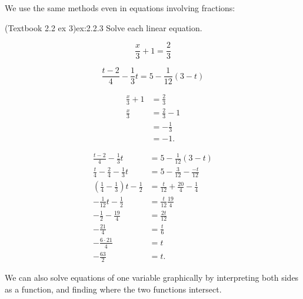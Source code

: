 \documentclass{article}
\begin{document}
We use the same methods even in equations involving fractions:
\begin{example}{(Textbook 2.2 ex 3)}{ex:2.2.3}
    Solve each linear equation.
    \begin{problem}
        \item \[\frac{x}{3}+1=\frac{2}{3}\] 
        \item \[\frac{t-2}{4}-\frac{1}{3}t = 5 - \frac{1}{12}(3-t)\] 
    \end{problem}
\end{example}
\begin{solution}
    \begin{problem}
        \item \begin{align*}
            \frac{x}{3}+1&=\frac{2}{3}\\
            \frac{x}{3}&=\frac{2}{3}-1\\
            &=-\frac{1}{3}\\
            &=-1.
        \end{align*}
        \item \begin{align*}
            \frac{t-2}{4}-\frac{1}{3}t&=5-\frac{1}{12}(3-t)\\
            \frac{t}{4}-\frac{2}{4}-\frac{1}{3}t&=5-\frac{3}{12}-\frac{-t}{12}\\
            \left(\frac{1}{4}-\frac{1}{3}\right)t-\frac{1}{2}&=\frac{t}{12}+\frac{20}{4}-\frac{1}{4}\\
            -\frac{1}{12}t-\frac{1}{2}&=\frac{t}{12}\frac{19}{4}\\
            -\frac{1}{2}-\frac{19}{4}&=\frac{2t}{12}\\
            -\frac{21}{4}&=\frac{t}{6}\\
            -\frac{6\cdot 21}{4}&=t\\
            -\frac{63}{2}&=t.
        \end{align*}
    \end{problem}
\end{solution}

We can also solve equations of one variable graphically by interpreting both sides as a function, and finding where the two functions intersect.
\end{document}
